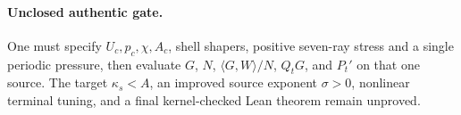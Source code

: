 \paragraph{Unclosed authentic gate.}
One must specify $U_c,p_c,\chi,A_c$, shell shapers, positive seven-ray stress and a single periodic pressure, then evaluate $G$, $N$, $\langle G,W\rangle/N$, $Q_tG$, and $P_t'$ on that one source. The target $\kappa_s<A$, an improved source exponent $\sigma>0$, nonlinear terminal tuning, and a final kernel-checked Lean theorem remain unproved.
